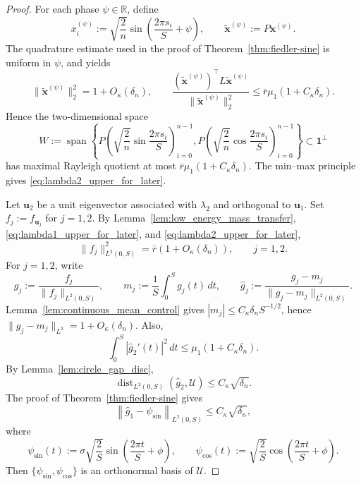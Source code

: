 \documentclass[10pt,a4paper]{amsart}
\begin{document}
\begin{proof}
	For each phase $\psi\in\mathbb{R}$, define
	\[
	x_i^{(\psi)}:=
	\sqrt{\frac2n}\sin\left(\frac{2\pi s_i}{S}+\psi\right),
	\qquad
	\widetilde{\boldsymbol{x}}^{(\psi)}:=P\boldsymbol{x}^{(\psi)}.
	\]
	The quadrature estimate used in the proof of
	Theorem~\ref{thm:fiedler-sine} is uniform in $\psi$, and yields
	\[
	\|\widetilde{\boldsymbol{x}}^{(\psi)}\|_2^2=1+O_\kappa(\delta_n),
	\qquad
	\frac{(\widetilde{\boldsymbol{x}}^{(\psi)})^\top
		L\widetilde{\boldsymbol{x}}^{(\psi)}}
	{\|\widetilde{\boldsymbol{x}}^{(\psi)}\|_2^2}
	\le
	\bar r\mu_1(1+C_\kappa\delta_n).
	\]
	Hence the two-dimensional space
	\[
	W:=
	\operatorname{span}\left\{
	P\left(\sqrt{\frac2n}\sin\frac{2\pi s_i}{S}\right)_{i=0}^{n-1},
	P\left(\sqrt{\frac2n}\cos\frac{2\pi s_i}{S}\right)_{i=0}^{n-1}
	\right\}
	\subset \boldsymbol{1}^\perp
	\]
	has maximal Rayleigh quotient at most
	$\bar r\mu_1(1+C_\kappa\delta_n)$. The min--max principle gives
	\eqref{eq:lambda2_upper_for_later}.
	
	Let $\boldsymbol{u}_2$ be a unit eigenvector associated with $\lambda_2$
	and orthogonal to $\boldsymbol{u}_1$. Set $f_j:=f_{\boldsymbol{u}_j}$
	for $j=1,2$. By Lemma~\ref{lem:low_energy_mass_transfer},
	\eqref{eq:lambda1_upper_for_later}, and \eqref{eq:lambda2_upper_for_later},
	\[
	\|f_j\|_{L^2(0,S)}^2=\bar r(1+O_\kappa(\delta_n)),
	\qquad j=1,2.
	\]
	For $j=1,2$, write
	\[
	g_j:=\frac{f_j}{\|f_j\|_{L^2(0,S)}},
	\qquad
	m_j:=\frac1S\int_0^S g_j(t)\,dt,
	\qquad
	\widehat g_j:=\frac{g_j-m_j}{\|g_j-m_j\|_{L^2(0,S)}}.
	\]
	Lemma~\ref{lem:continuous_mean_control} gives
	$|m_j|\le C_\kappa\delta_n S^{-1/2}$, hence
	$\|g_j-m_j\|_{L^2}=1+O_\kappa(\delta_n)$. Also,
	\[
	\int_0^S|\widehat g_2'(t)|^2\,dt\le \mu_1(1+C_\kappa\delta_n).
	\]
	By Lemma~\ref{lem:circle_gap_disc},
	\begin{equation}\label{eq:g2_close_U}
		\operatorname{dist}_{L^2(0,S)}(\widehat g_2,\mathcal U)
		\le C_\kappa\sqrt{\delta_n}.
	\end{equation}
	The proof of Theorem~\ref{thm:fiedler-sine} gives
	\begin{equation}\label{eq:g1_close_sine_for_cosine}
		\left\|
		\widehat g_1-\psi_{\sin}
		\right\|_{L^2(0,S)}
		\le
		C_\kappa\sqrt{\delta_n},
	\end{equation}
	where
	\[
	\psi_{\sin}(t):=
	\sigma\sqrt{\frac2S}\sin\left(\frac{2\pi t}{S}+\phi\right),
	\qquad
	\psi_{\cos}(t):=
	\sqrt{\frac2S}\cos\left(\frac{2\pi t}{S}+\phi\right).
	\]
	Then $\{\psi_{\sin},\psi_{\cos}\}$ is an orthonormal basis of
	$\mathcal U$.
	

\end{proof}
\end{document}
